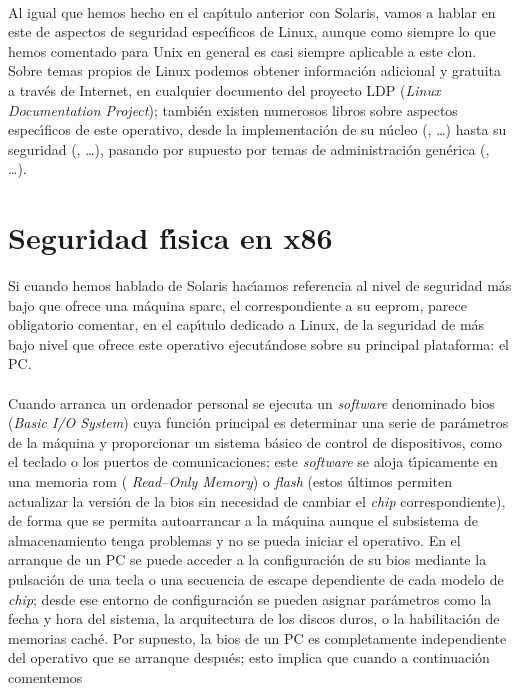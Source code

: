 \\Al igual que hemos hecho en el cap\'{\i}tulo anterior con Solaris, vamos a
hablar en este de aspectos de seguridad espec\'{\i}ficos de Linux, aunque como
siempre lo que hemos comentado para Unix en general es casi siempre aplicable a
este clon. Sobre temas propios de Linux podemos obtener informaci\'on adicional 
y gratuita a trav\'es de Internet, en cualquier documento del proyecto LDP 
({\it Linux Documentation Project}); tambi\'en existen numerosos libros sobre
aspectos espec\'{\i}ficos de este operativo, desde la implementaci\'on de su
n\'ucleo (\cite{kn:bec96}, \cite{kn:car97}\ldots) hasta su seguridad 
(\cite{kn:tox00}, \cite{kn:ano01}\ldots), pasando por supuesto por temas de 
administraci\'on gen\'erica (\cite{kn:ha99}, \cite{kn:bal00}\ldots).
\section{Seguridad f\'{\i}sica en x86}
Si cuando hemos hablado de Solaris hac\'{\i}amos referencia al nivel de
seguridad m\'as bajo que ofrece una m\'aquina {\sc sparc}, el correspondiente a
su {\sc eeprom}, parece obligatorio comentar, en el cap\'{\i}tulo dedicado a
Linux, de la seguridad de m\'as bajo nivel que ofrece este operativo 
ejecut\'andose sobre su principal plataforma: el PC.\\
\\Cuando arranca un ordenador personal se ejecuta un {\it software} denominado 
{\sc bios} ({\it Basic I/O System}) cuya funci\'on principal es determinar una 
serie de par\'ametros de la m\'aquina y proporcionar un sistema b\'asico de 
control de dispositivos, como el teclado o los puertos de comunicaciones; este
{\it software} se aloja t\'{\i}picamente en una memoria {\sc rom} ({\it 
Read--Only Memory}) o {\it flash} (estos \'ultimos permiten actualizar la 
versi\'on de la {\sc bios} sin necesidad de cambiar el {\it chip} 
correspondiente), de forma que se permita autoarrancar a la m\'aquina aunque 
el subsistema de almacenamiento tenga problemas y no se pueda iniciar el 
operativo. En el arranque de un PC se puede acceder a la configuraci\'on de
su {\sc bios} mediante la pulsaci\'on de una tecla o una secuencia de escape 
dependiente de cada modelo de {\it chip}; desde ese entorno de configuraci\'on 
se pueden asignar par\'ametros como la fecha y hora del sistema, la 
arquitectura de los discos duros, o la habilitaci\'on de memorias cach\'e. Por 
supuesto, la {\sc bios} de un PC es completamente independiente del operativo 
que se arranque despu\'es; esto implica que cuando a continuaci\'on comentemos 
